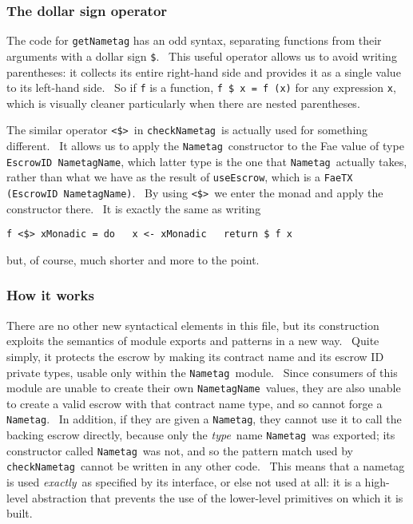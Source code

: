 \documentclass[11pt]{article}
\newcommand{\codeblock}[1]{\begin{mdframed}[
    backgroundcolor=header-color,
    linecolor=header-color,
    innertopmargin=10pt,
    ]{\texttt{#1}}\end{mdframed}}
\begin{document}
\subsubsection{The dollar sign operator}
\vspace{5.5pt}

The code for \texttt{getNametag} has an odd syntax, separating functions from their arguments with a dollar sign \texttt{\$}.  This useful operator allows us to avoid writing parentheses: it collects its entire right-hand side and provides it as a single value to its left-hand side.  So if \texttt{f} is a function, \texttt{f \$ x = f (x)} for any expression \texttt{x}, which is visually cleaner particularly when there are nested parentheses.


\vspace{11pt}

The similar operator \texttt{\textless{}}\texttt{\$}\texttt{\textgreater{}} in \texttt{checkNametag} is actually used for something different.  It allows us to apply the \texttt{Nametag} constructor to the Fae value of type \texttt{EscrowID NametagName}, which latter type is the one that \texttt{Nametag} actually takes, rather than what we have as the result of \texttt{useEscrow}, which is a \texttt{FaeTX (EscrowID NametagName)}.  By using \texttt{\textless{}}\texttt{\$}\texttt{\textgreater{}} we enter the monad and apply the constructor there.  It is exactly the same as writing

\codeblock{f \textless{}\$\textgreater{} xMonadic = do\newline
  x \textless{}- xMonadic\newline
  return \$ f x}

but, of course, much shorter and more to the point.

\subsubsection{How it works}
\vspace{5.5pt}

There are no other new syntactical elements in this file, but its construction exploits the semantics of module exports and patterns in a new way.  Quite simply, it protects the escrow by making its contract name and its escrow ID private types, usable only within the \texttt{Nametag} module.  Since consumers of this module are unable to create their own \texttt{NametagName} values, they are also unable to create a valid escrow with that contract name type, and so cannot forge a \texttt{Nametag}.  In addition, if they are given a \texttt{Nametag}, they cannot use it to call the backing escrow directly, because only the \textit{type} name \texttt{Nametag} was exported; its constructor called \texttt{Nametag} was not, and so the pattern match used by \texttt{checkNametag} cannot be written in any other code.  This means that a nametag is used \textit{exactly} as specified by its interface, or else not used at all: it is a high-level abstraction that prevents the use of the lower-level primitives on which it is built.
\end{document}
